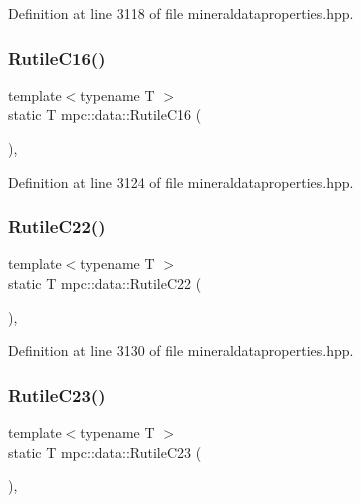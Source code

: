 Definition at line 3118 of file mineraldataproperties.\+hpp.

\mbox{\label{namespacempc_1_1data_acc527852564f39e6aa0d8fdc3adbfc6d}} 
\subsubsection{\texorpdfstring{Rutile\+C16()}{RutileC16()}}
{\footnotesize\ttfamily template$<$typename T $>$ \\
static T mpc\+::data\+::\+Rutile\+C16 (\begin{DoxyParamCaption}{ }\end{DoxyParamCaption})\hspace{0.3cm}{\ttfamily [inline]}, {\ttfamily [static]}}



Definition at line 3124 of file mineraldataproperties.\+hpp.

\mbox{\label{namespacempc_1_1data_a2c9ffb7a7bad769424d08349e230ba92}} 
\subsubsection{\texorpdfstring{Rutile\+C22()}{RutileC22()}}
{\footnotesize\ttfamily template$<$typename T $>$ \\
static T mpc\+::data\+::\+Rutile\+C22 (\begin{DoxyParamCaption}{ }\end{DoxyParamCaption})\hspace{0.3cm}{\ttfamily [inline]}, {\ttfamily [static]}}



Definition at line 3130 of file mineraldataproperties.\+hpp.

\mbox{\label{namespacempc_1_1data_a230265afbf2e9e9fc43a2b89e17b7073}} 
\subsubsection{\texorpdfstring{Rutile\+C23()}{RutileC23()}}
{\footnotesize\ttfamily template$<$typename T $>$ \\
static T mpc\+::data\+::\+Rutile\+C23 (\begin{DoxyParamCaption}{ }\end{DoxyParamCaption})\hspace{0.3cm}{\ttfamily [inline]}, {\ttfamily [static]}}



